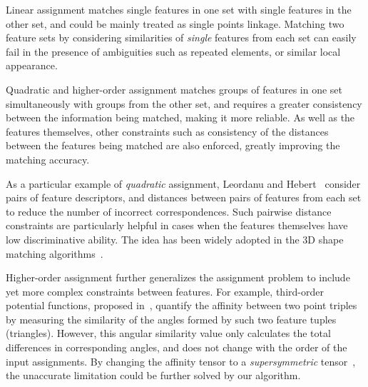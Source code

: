 Linear assignment matches single features in one set with single features in the other set, and could be mainly treated as single points linkage.
Matching two feature sets by considering similarities of \emph{single} features from each set can easily fail in the presence of ambiguities such as repeated elements,
or similar local appearance.

Quadratic and higher-order assignment matches groups of features in one set simultaneously with groups from the other set,
and requires a greater consistency between the information being matched, making it more reliable.
As well as the features themselves, other constraints such as consistency of the distances between the features being matched are also enforced,
greatly improving the matching accuracy.

As a particular example of \emph{quadratic} assignment, Leordanu and Hebert~\cite{Leordeanu05} consider pairs of feature descriptors,
and distances between pairs of features from each set to reduce the number of incorrect correspondences.
Such pairwise distance constraints are particularly helpful in cases when the features themselves have low discriminative ability.
The idea has been widely adopted in the 3D shape matching algorithms~\cite{Tevs09,Ovsjanikov10,Tevs11,Kim11,SahilliogluY11,Windheuser11}.

Higher-order assignment further generalizes the assignment problem to include yet more complex constraints between features.
For example, third-order potential functions, proposed in~\cite{Duchenne09,Zeng10,Chertok10},
quantify the affinity between two point triples by measuring the similarity of the angles formed by such two feature tuples (triangles).
However, this angular similarity value only calculates the total differences in corresponding angles,
and does not change with the order of the input assignments.
By changing the affinity tensor to a \emph{supersymmetric} tensor~\cite{Kofidis02}, the unaccurate limitation could be further solved by our algorithm.

